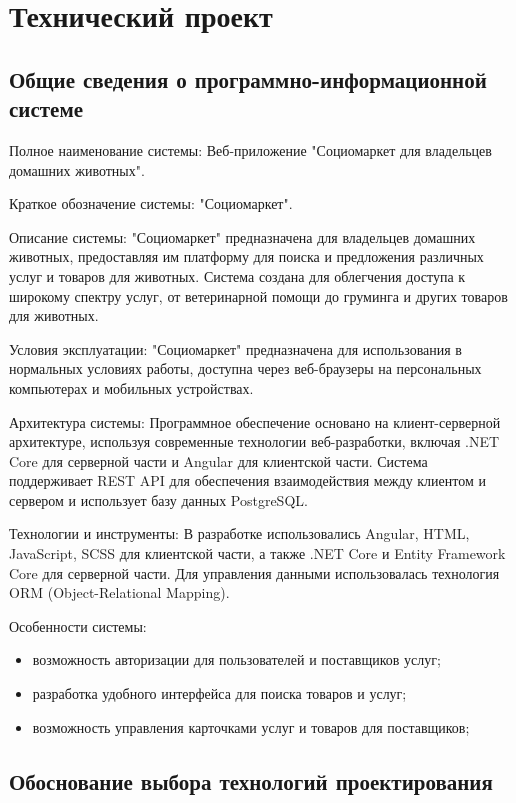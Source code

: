 \section{Технический проект}

\subsection{Общие сведения о программно-информационной системе}

Полное наименование системы: Веб-приложение "Социомаркет для владельцев домашних животных".

Краткое обозначение системы: "Социомаркет".

Описание системы: "Социомаркет" предназначена для владельцев домашних животных, предоставляя им платформу для поиска и предложения различных услуг и товаров для животных. Система создана для облегчения доступа к широкому спектру услуг, от ветеринарной помощи до груминга и других товаров для животных.

Условия эксплуатации: "Социомаркет" предназначена для использования в нормальных условиях работы, доступна через веб-браузеры на персональных компьютерах и мобильных устройствах.

Архитектура системы: Программное обеспечение основано на клиент-серверной архитектуре, используя современные технологии веб-разработки, включая .NET Core для серверной части и Angular для клиентской части. Система поддерживает REST API для обеспечения взаимодействия между клиентом и сервером и использует базу данных PostgreSQL.

Технологии и инструменты: В разработке использовались Angular, HTML, JavaScript, SCSS для клиентской части, а также .NET Core и Entity Framework Core для серверной части. Для управления данными использовалась технология ORM (Object-Relational Mapping).

Особенности системы:
\begin{itemize}
    \item возможность авторизации для пользователей и поставщиков услуг;
    \item разработка удобного интерфейса для поиска товаров и услуг;
    \item возможность управления карточками услуг и товаров для поставщиков;
\end{itemize}

\subsection{Обоснование выбора технологий проектирования}
